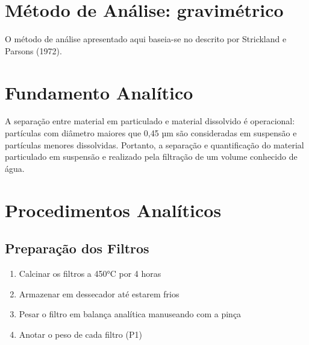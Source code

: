 \documentclass[a4paper,10pt]{SelfArx}
\affiliation{~} %
\begin{document}
\flushbottom %
\maketitle %
\renewcommand{\contentsname}{Conteúdo}
\tableofcontents %
\thispagestyle{empty} %

\section*{Método de Análise: gravimétrico} %
O método de análise apresentado aqui baseia-se no descrito por Strickland e Parsons (1972).

\section{Fundamento Analítico}

A separação entre material em particulado e material dissolvido é operacional: partículas com diâmetro maiores que 0,45 µm são consideradas em suspensão e partículas menores dissolvidas. Portanto, a separação e quantificação do material particulado em suspensão e realizado pela filtração de um volume conhecido de água.

\section{Procedimentos Analíticos}
\subsection{Preparação dos Filtros}
\begin{enumerate}[noitemsep]
\item Calcinar os filtros a 450°C por 4 horas
\item Armazenar em dessecador até estarem frios
\item Pesar o filtro em balança analítica manuseando com a pinça
\item Anotar o peso de cada filtro (P1)
\end{enumerate}
\end{document}
